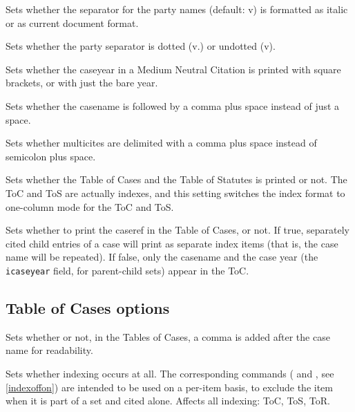 
Sets whether the separator for the party names (default: v) is formatted as italic or as current document format.
\bigskip


Sets whether the party separator is dotted (v.) or undotted (v).
\bigskip


Sets whether the caseyear in a Medium Neutral Citation is printed with square brackets, or with just the bare year.
\bigskip


Sets whether the casename is followed by a comma plus space instead of just a space.
\bigskip


Sets whether multicites are delimited with a comma plus space instead of semicolon plus space.
\bigskip



Sets whether the Table of Cases and the Table of Statutes is printed or not. The ToC and ToS are actually indexes, and this setting switches the index format to one-column mode for the ToC and ToS.
\bigskip


Sets whether to print the caseref in the Table of Cases, or not. If true, separately cited child entries of a case will print as separate index items (that is, the case name will be repeated). If false, only the casename and the case year (the \texttt{icaseyear} field, for parent-child sets) appear in the ToC.
\bigskip


\subsection{Table of Cases options}


Sets whether or not, in the Tables of Cases, a comma is added after the case name for readability.
\bigskip


Sets whether indexing occurs at all. The corresponding commands ( and , see \autoref{indexoffon}) are intended to be used on a per-item basis, to exclude the item when it is part of a set and cited alone. Affects all indexing: ToC, ToS, ToR.
\bigskip


